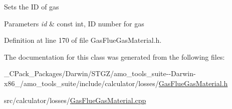 Sets the ID of gas 
\begin{DoxyParams}{Parameters}
{\em id} & const int, ID number for gas \\
\hline
\end{DoxyParams}


Definition at line 170 of file Gas\+Flue\+Gas\+Material.\+h.



The documentation for this class was generated from the following files\+:\begin{DoxyCompactItemize}
\item 
\+\_\+\+C\+Pack\+\_\+\+Packages/\+Darwin/\+S\+T\+G\+Z/amo\+\_\+tools\+\_\+suite-\/-\/\+Darwin-\/x86\+\_/amo\+\_\+tools\+\_\+suite/include/calculator/losses/\hyperlink{___c_pack___packages_2_darwin_2_s_t_g_z_2amo__tools__suite--_darwin-x86__64_2amo__tools__suite_2004d7ef7737e3755a6d819de5baaee93}{Gas\+Flue\+Gas\+Material.\+h}\item 
src/calculator/losses/\hyperlink{_gas_flue_gas_material_8cpp}{Gas\+Flue\+Gas\+Material.\+cpp}\end{DoxyCompactItemize}
